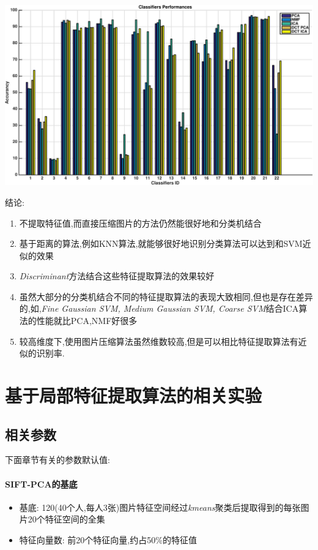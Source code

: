 	\begin{center}
	\begin{minipage}[t]{\linewidth}
	\center
	{
	\includegraphics[width=\textwidth]{Img/pni_res} 
	}
	\end{minipage}
	\medskip
	\end{center}
	
结论:
\begin{enumerate}
	\item 不提取特征值,而直接压缩图片的方法仍然能很好地和分类机结合
	\item 基于距离的算法,例如KNN算法,就能够很好地识别分类算法可以达到和SVM近似的效果
	\item \textit{Discriminant}方法结合这些特征提取算法的效果较好
	\item 虽然大部分的分类机结合不同的特征提取算法的表现大致相同,但也是存在差异的,如,\textit{Fine Gaussian SVM, Medium Gaussian SVM, Coarse SVM}结合ICA算法的性能就比PCA,NMF好很多
	\item 较高维度下,使用图片压缩算法虽然维数较高,但是可以相比特征提取算法有近似的识别率.
\end{enumerate}


\section{基于局部特征提取算法的相关实验}
\label{sec:comp_local}

\subsection{相关参数}
下面章节有关的参数默认值:

\paragraph{SIFT-PCA的基底}
\begin{itemize}
	\item 基底: 120(40个人,每人3张)图片特征空间经过\textit{kmeans}聚类后提取得到的每张图片20个特征空间的全集
	\item 特征向量数: 前20个特征向量,约占50\%的特征值
\end{itemize}

